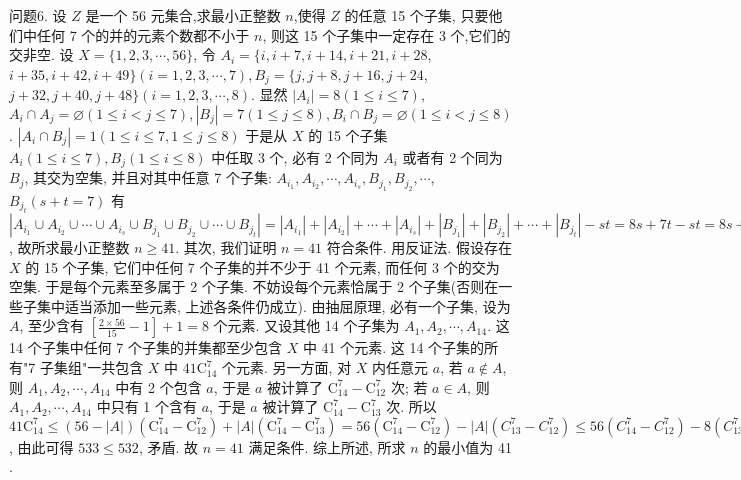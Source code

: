 问题6. 设 $Z$ 是一个 56 元集合,求最小正整数 $n$,使得 $Z$ 的任意 15 个子集, 只要他们中任何 7 个的并的元素个数都不小于 $n$, 则这 15 个子集中一定存在 3 个,它们的交非空.
设 $X=\{1,2,3, \cdots, 56\}$, 令 $A_i=\{i, i+7, i+14, i+21, i+28$, $i+35, i+42, i+49\}(i=1,2,3, \cdots, 7), B_j=\{j, j+8, j+16, j+24$, $j+32, j+40, j+48\}(i=1,2,3, \cdots, 8)$. 显然 $\left|A_i\right|=8(1 \leqslant i \leqslant 7)$, $A_i \cap A_j=\varnothing(1 \leqslant i<j \leqslant 7),\left|B_j\right|=7(1 \leqslant j \leqslant 8), B_i \cap B_j=\varnothing(1 \leqslant i<j \leqslant 8)$. $\left|A_i \cap B_j\right|=1(1 \leqslant i \leqslant 7,1 \leqslant j \leqslant 8)$ 于是从 $X$ 的 15 个子集 $A_i(1 \leqslant i \leqslant 7), B_j(1 \leqslant i \leqslant 8)$ 中任取 3 个, 必有 2 个同为 $A_i$ 或者有 2 个同为 $B_j$, 其交为空集, 并且对其中任意 7 个子集: $A_{i_1}, A_{i_2}, \cdots, A_{i_s}, B_{j_1}, B_{j_2}, \cdots$, $B_{j_t}(s+t=7)$ 有 $\left|A_{i_1} \cup A_{i_2} \cup \cdots \cup A_{i_s} \cup B_{j_1} \cup B_{j_2} \cup \cdots \cup B_{j_t}\right|=\left|A_{i_1}\right|+ \left|A_{i_2}\right|+\cdots+\left|A_{i_s}\right|+\left|B_{j_1}\right|+\left|B_{j_2}\right|+\cdots+\left|B_{j_t}\right|-s t=8 s+7 t-s t=8 s+ 7(7-s)-s(7-s)=(s-3)^2+40 \geqslant 40$, 故所求最小正整数 $n \geqslant 41$. 其次, 我们证明 $n=41$ 符合条件.
用反证法.
假设存在 $X$ 的 15 个子集, 它们中任何 7 个子集的并不少于 41 个元素, 而任何 3 个的交为空集.
于是每个元素至多属于 2 个子集.
不妨设每个元素恰属于 2 个子集(否则在一些子集中适当添加一些元素, 上述各条件仍成立). 由抽屈原理, 必有一个子集, 设为 $A$, 至少含有 $\left[\frac{2 \times 56}{15}-1\right]+1=8$ 个元素.
又设其他 14 个子集为 $A_1, A_2, \cdots, A_{14}$. 这 14 个子集中任何 7 个子集的并集都至少包含 $X$ 中 41 个元素.
这 14 个子集的所有"7 子集组"一共包含 $X$ 中 $41 \mathrm{C}_{14}^7$ 个元素.
另一方面, 对 $X$ 内任意元 $a$, 若 $a \notin A$, 则 $A_1, A_2, \cdots, A_{14}$ 中有 2 个包含 $a$, 于是 $a$ 被计算了 $\mathrm{C}_{14}^7-\mathrm{C}_{12}^7$ 次; 若 $a \in A$, 则 $A_1, A_2, \cdots, A_{14}$ 中只有 1 个含有 $a$, 于是 $a$ 被计算了 $\mathrm{C}_{14}^7-\mathrm{C}_{13}^7$ 次.
所以 $41 \mathrm{C}_{14}^7 \leqslant(56-|A|)\left(\mathrm{C}_{14}^7-\mathrm{C}_{12}^7\right)+|A|\left(\mathrm{C}_{14}^7-\mathrm{C}_{13}^7\right)=56\left(\mathrm{C}_{14}^7-\mathrm{C}_{12}^7\right)- |A|\left(C_{13}^7-C_{12}^7\right) \leqslant 56\left(C_{14}^7-C_{12}^7\right)-8\left(C_{13}^7-C_{12}^7\right)$, 由此可得 $533 \leqslant 532$, 矛盾.
故 $n=41$ 满足条件.
综上所述, 所求 $n$ 的最小值为 41 .




